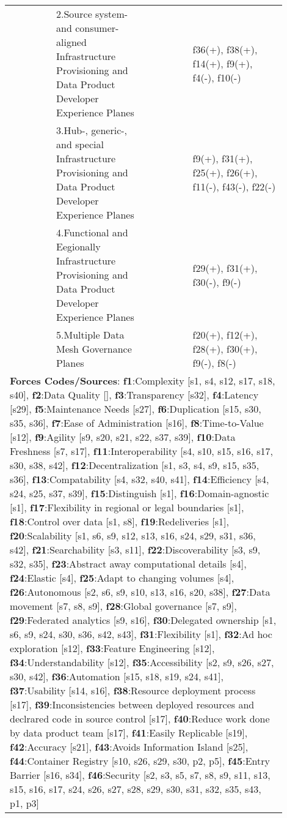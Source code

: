 \begin{tabular}{|p{0.12\linewidth}|p{0.015\linewidth}|p{0.3\linewidth}|p{0.15\linewidth}|p{0.31\linewidth}|}
 & \cellcolor{emerald_shape_3}{} & 2.Source system- and consumer-aligned Infrastructure Provisioning and Data Product Developer Experience Planes&\cellcolor{emerald_shape_7}{s1, s2, s8, p2, p3, p5, p6} & f36(+), f38(+), f14(+), f9(+), f4(-), f10(-)\\
 & \cellcolor{emerald_shape_3}{} & 3.Hub-, generic-, and special Infrastructure Provisioning and Data Product Developer Experience Planes&\cellcolor{emerald_shape_5}{s1, p3, p5} & f9(+), f31(+), f25(+), f26(+), f11(-), f43(-), f22(-)\\
 & \cellcolor{emerald_shape_3}{} & 4.Functional and Eegionally Infrastructure Provisioning and Data Product Developer Experience Planes&\cellcolor{emerald_shape_5}{s1, p1, p3} & f29(+), f31(+), f30(-), f9(-)\\
 & \multirow{-5}{\linewidth}{ \cellcolor{emerald_shape_3}{8}} &5.Multiple Data Mesh Governance Planes&\cellcolor{emerald_shape_3}{s1} & f20(+), f12(+), f28(+), f30(+), f9(-), f8(-)\\
\hline
\multicolumn{5}{l}{\parbox{\textwidth}{\smallskip
{\bf Forces Codes/Sources}: {\bf f1}:Complexity [s1, s4, s12, s17, s18, s40], {\bf f2}:Data Quality [], {\bf f3}:Transparency [s32], {\bf f4}:Latency [s29], {\bf f5}:Maintenance Needs [s27], {\bf f6}:Duplication [s15, s30, s35, s36], {\bf f7}:Ease of Administration [s16], {\bf f8}:Time-to-Value [s12], {\bf f9}:Agility [s9, s20, s21, s22, s37, s39], {\bf f10}:Data Freshness [s7, s17], {\bf f11}:Interoperability [s4, s10, s15, s16, s17, s30, s38, s42], {\bf f12}:Decentralization [s1, s3, s4, s9, s15, s35, s36], {\bf f13}:Compatability [s4, s32, s40, s41], {\bf f14}:Efficiency [s4, s24, s25, s37, s39], {\bf f15}:Distinguish [s1], {\bf f16}:Domain-agnostic [s1], {\bf f17}:Flexibility in regional or legal boundaries [s1], {\bf f18}:Control over data [s1, s8], {\bf f19}:Redeliveries [s1], {\bf f20}:Scalability [s1, s6, s9, s12, s13, s16, s24, s29, s31, s36, s42], {\bf f21}:Searchability [s3, s11], {\bf f22}:Discoverability [s3, s9, s32, s35], {\bf f23}:Abstract away computational details [s4], {\bf f24}:Elastic [s4], {\bf f25}:Adapt to changing volumes [s4], {\bf f26}:Autonomous [s2, s6, s9, s10, s13, s16, s20, s38], {\bf f27}:Data movement [s7, s8, s9], {\bf f28}:Global governance [s7, s9], {\bf f29}:Federated analytics [s9, s16], {\bf f30}:Delegated ownership [s1, s6, s9, s24, s30, s36, s42, s43], {\bf f31}:Flexibility [s1], {\bf f32}:Ad hoc exploration [s12], {\bf f33}:Feature Engineering [s12], {\bf f34}:Understandability [s12], {\bf f35}:Accessibility [s2, s9, s26, s27, s30, s42], {\bf f36}:Automation [s15, s18, s19, s24, s41], {\bf f37}:Usability [s14, s16], {\bf f38}:Resource deployment process [s17], {\bf f39}:Inconsistencies between deployed resources and declrared code in source control [s17], {\bf f40}:Reduce work done by data product team [s17], {\bf f41}:Easily Replicable [s19], {\bf f42}:Accuracy [s21], {\bf f43}:Avoids Information Island [s25], {\bf f44}:Container Registry [s10, s26, s29, s30, p2, p5], {\bf f45}:Entry Barrier [s16, s34], {\bf f46}:Security [s2, s3, s5, s7, s8, s9, s11, s13, s15, s16, s17, s24, s26, s27, s28, s29, s30, s31, s32, s35, s43, p1, p3]}}
\end{tabular}
